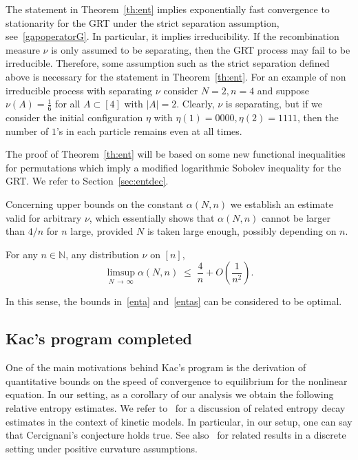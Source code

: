 \documentclass[AHL,Unicode,longabstracts,published]{cedram}
\renewcommand{\leq}{\;\leqslant\;}
\newcommand{\bbN}{\mathbb{N}}
\let\a=\alpha
\begin{document}
\begin{rema}\label{rem:nonreg}
The statement in Theorem~\ref{th:ent} implies exponentially fast convergence to stationarity for the GRT under the strict separation assumption, see~\eqref{gapoperatorG}. In particular, it implies irreducibility. If the recombination measure $\nu$ is only assumed to be separating, then the GRT process may fail to be irreducible. Therefore, some assumption such as the strict separation defined above is necessary for the statement in Theorem~\ref{th:ent}. For an example of non irreducible process with separating $\nu$ consider $N=2,n=4$ and suppose $\nu(A)=\frac16$ for all $A\subset[4]$ with $|A|=2$. Clearly, $\nu$ is separating, but if we consider the initial configuration $\eta$ with $\eta(1)=0000, \eta(2)=1111$, then the number of $1$'s in each particle remains even at all times.
\end{rema}

The proof of Theorem~\ref{th:ent} will be based on some new functional inequalities for permutations which imply a modified logarithmic Sobolev inequality for the GRT. We refer to Section~\ref{sec:entdec}.

Concerning upper bounds on the constant $\a(N,n)$ we establish an estimate valid for arbitrary $\nu$, which essentially shows that $\a(N,n)$ cannot be larger than $4/n$ for $n$ large, provided $N$ is taken large enough, possibly depending on $n$.

\begin{prop}\label{prop:upbo}
For any $n\in\bbN$, any distribution $\nu$ on $[n]$,
\begin{equation}\label{entalow}
\limsup_{N\,\to\,\infty}\a(N,n)\leq \frac4n + O\left(\frac1{n^2}\right).
\end{equation}
\end{prop}

In this sense, the bounds in~\eqref{enta} and~\eqref{entas} can be considered to be optimal.


\subsection{Kac's program completed}

One of the main motivations behind Kac's program is the derivation of quantitative bounds on the speed of convergence to equilibrium for the nonlinear equation. In our setting, as a corollary of our analysis we obtain the following relative entropy estimates. We refer to~\cite{entfound,Vil} for a discussion of related entropy decay estimates in the context of kinetic models. In particular, in our setup, one can say that Cercignani's conjecture holds true. See also~\cite{erbar} for related results in a discrete setting under positive curvature assumptions.
\end{document}
